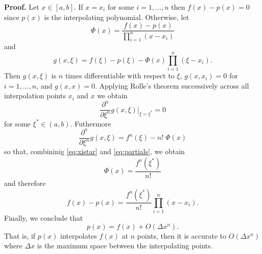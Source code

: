 \documentclass{article}
\numberwithin{equation}{section}
\begin{document}
\textbf{Proof.}  Let $x \in [a,b]$.  If $x = x_i$ for some
$i=1,\ldots,n$ then $f(x) - p(x) = 0$ since $p(x)$ is the
interpolating polynomial.  Otherwise, let
\begin{equation}
  \Phi(x) = \frac{f(x) - p(x)}{\prod_{i=1}^n (x - x_i)}
\end{equation}
and
\begin{equation}
  g(x,\xi) = f(\xi) - p(\xi) - \Phi(x) \prod_{i=1}^n (\xi - x_i).
\end{equation}
Then $g(x,\xi)$ is $n$ times differentiable with respect to $\xi$,
$g(x,x_i) = 0$ for $i=1,\ldots,n$, and $g(x,x) = 0$.  Applying Rolle's
theorem successively across all interpolation points $x_i$ and $x$ we
obtain
\begin{equation}
  \label{eq:xistar}
  \frac{\partial^n}{\partial \xi^n} g(x,\xi)\biggr|_{\xi=\xi^*} = 0
\end{equation}
for some $\xi^* \in (a,b)$.  Futhermore
\begin{equation}
  \label{eq:partials}
  \frac{\partial^n}{\partial \xi^n} g(x,\xi) = f^n(\xi) - n!\;\Phi(x)
\end{equation}
so that, combininig \eqref{eq:xistar} and \eqref{eq:partials}, we obtain
\begin{equation}
  \Phi(x) = \frac{f^n(\xi^*)}{n!}
\end{equation}
and therefore
\begin{equation}
  f(x) - p(x) = \frac{f^n(\xi^*)}{n!} \prod_{i=1}^n (x - x_i).
\end{equation}
Finally, we conclude that
\begin{equation}
  p(x) = f(x) + O(\Delta x^n).
\end{equation}
That is, if $p(x)$ interpolates $f(x)$ at $n$ points, then it is
accurate to $O(\Delta x^n)$ where $\Delta x$ is the maximum space
between the interpolating points.
\end{document}
